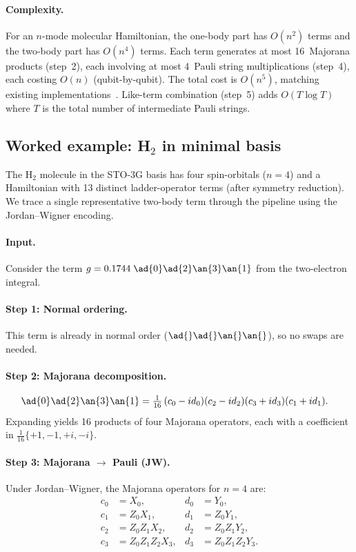 \paragraph{Complexity.}
For an $n$-mode molecular Hamiltonian, the one-body part has $O(n^2)$
terms and the two-body part has $O(n^4)$ terms.  Each term generates
at most 16~Majorana products (step~2), each involving at most 4~Pauli
string multiplications (step~4), each costing $O(n)$ (qubit-by-qubit).
The total cost is $O(n^5)$, matching existing
implementations~\cite{mcclean2020, bergholm2022}.  Like-term
combination (step~5) adds $O(T \log T)$ where $T$ is the total number
of intermediate Pauli strings.

\subsection{Worked example: H$_2$ in minimal basis}
\label{sec:ham-example}

The H$_2$ molecule in the STO-3G basis has four spin-orbitals
($n = 4$) and a Hamiltonian with 13 distinct ladder-operator terms
(after symmetry reduction).  We trace a single representative
two-body term through the pipeline using the Jordan--Wigner encoding.

\paragraph{Input.}
Consider the term $g = 0.1744\;\ad{0}\ad{2}\an{3}\an{1}$ from the
two-electron integral.

\paragraph{Step 1: Normal ordering.}
This term is already in normal order ($\ad{}\ad{}\an{}\an{}$), so
no swaps are needed.

\paragraph{Step 2: Majorana decomposition.}
\begin{align*}
  \ad{0}\ad{2}\an{3}\an{1}
  &= \tfrac{1}{16}\,(c_0 - id_0)(c_2 - id_2)(c_3 + id_3)(c_1 + id_1).
\end{align*}
Expanding yields 16 products of four Majorana operators, each with a
coefficient in $\frac{1}{16}\{+1, -1, +i, -i\}$.

\paragraph{Step 3: Majorana $\to$ Pauli (JW).}
Under Jordan--Wigner, the Majorana operators for $n = 4$ are:
\begin{align*}
  c_0 &= X_0,         & d_0 &= Y_0, \\
  c_1 &= Z_0 X_1,     & d_1 &= Z_0 Y_1, \\
  c_2 &= Z_0 Z_1 X_2, & d_2 &= Z_0 Z_1 Y_2, \\
  c_3 &= Z_0 Z_1 Z_2 X_3, & d_3 &= Z_0 Z_1 Z_2 Y_3.
\end{align*}

